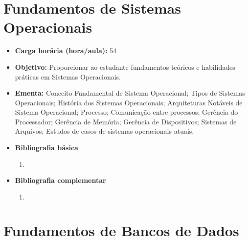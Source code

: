 \documentclass[11pt,fleqn]{book} %
\begin{document}
\section{Fundamentos de Sistemas Operacionais}\label{2_sistop}
\begin{itemize}
	\item \textbf{Carga horária (hora/aula):} 54
	\item \textbf{Objetivo:} Proporcionar ao estudante fundamentos teóricos e habilidades práticas em Sistemas Operacionais.
	\item \textbf{Ementa:} 
	Conceito Fundamental de Sistema Operacional; 
	Tipos de Sistemas Operacionais; 
	História dos Sistemas Operacionais; 
	Arquiteturas Notáveis de Sistema Operacional; 
	Processo; 
	Comunicação entre processos; 
	Gerência do Processador; 
	Gerência de Memória; 
	Gerência de Dispositivos; 
	Sistemas de Arquivos; 
	Estudos de casos de sistemas operacionais atuais.
	\item \textbf{Bibliografia básica}
	\begin{enumerate}
		\item 
	\end{enumerate}
	\item \textbf{Bibliografia complementar}
	\begin{enumerate}
		\item 
	\end{enumerate}	
\end{itemize}


\newpage
\section{Fundamentos de Bancos de Dados}\label{2_bancodados}
\end{document}
